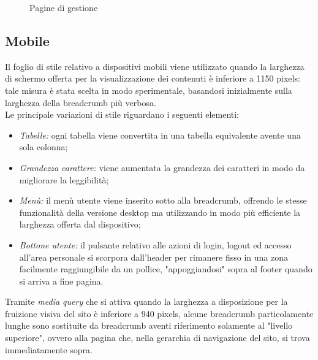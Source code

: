 \documentclass{article}
\begin{document}
\begin{figure}[H]
	\centering
	\caption{Pagine di gestione}
\end{figure}

\subsection{Mobile}
\label{presentazione:mobile}
Il foglio di stile relativo a dispositivi mobili viene utilizzato quando la larghezza di schermo offerta per la visualizzazione dei contenuti è inferiore a 1150 pixels: tale misura è stata scelta in modo sperimentale, basandosi inizialmente sulla larghezza della breadcrumb più verbosa.\\
Le principale variazioni di stile riguardano i seguenti elementi:
\begin{itemize}
	\item \textit{Tabelle:} ogni tabella viene convertita in una tabella equivalente avente una sola colonna;
	\item \textit{Grandezza carattere:} viene aumentata la grandezza dei caratteri in modo da migliorare la leggibilità;
	\item \textit{Menù:} il menù utente viene inserito sotto alla breadcrumb, offrendo le stesse funzionalità della versione desktop ma utilizzando in modo più efficiente la larghezza offerta dal dispositivo;
	\item \textit{Bottone utente:} il pulsante relativo alle azioni di login, logout ed accesso all'area personale si scorpora dall'header per rimanere fisso in una zona facilmente raggiungibile da un pollice, "appoggiandosi" sopra al footer quando si arriva a fine pagina.
\end{itemize}
Tramite \textit{media query} che si attiva quando la larghezza a disposizione per la fruizione visiva del sito è inferiore a 940 pixels, alcune breadcrumb particolamente lunghe sono sostituite da breadcrumb aventi riferimento solamente al "livello superiore", ovvero alla pagina che, nella gerarchia di navigazione del sito, si trova immediatamente sopra.
\end{document}
